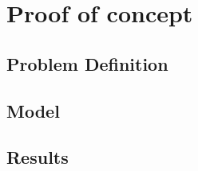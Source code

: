 \chapter{Proof of concept}
\label{chap-six}

\section{Problem Definition}


\section{Model}

\section{Results}



